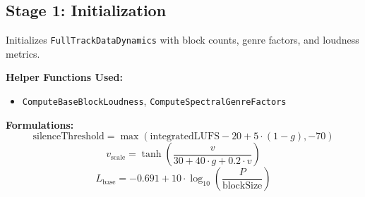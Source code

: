 \documentclass[11pt]{article}
\begin{document}
\subsection{Stage 1: Initialization}
Initializes \texttt{FullTrackDataDynamics} with block counts, genre factors, and loudness metrics.

\textbf{Helper Functions Used:}
\begin{itemize}
  \item \texttt{ComputeBaseBlockLoudness}, \texttt{ComputeSpectralGenreFactors}
\end{itemize}

\textbf{Formulations:}
\begin{equation}
\text{silenceThreshold} = \max(\text{integratedLUFS} - 20 + 5 \cdot (1 - g), -70)
\end{equation}
\begin{equation}
v_{\text{scale}} = \tanh\left(\frac{v}{30 + 40 \cdot g + 0.2 \cdot v}\right)
\end{equation}
\begin{equation}
L_{\text{base}} = -0.691 + 10 \cdot \log_{10}\left(\frac{P}{\text{blockSize}}\right)
\end{equation}
\end{document}
